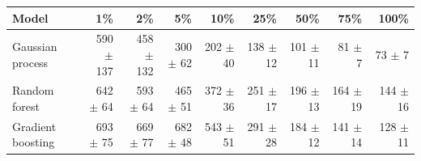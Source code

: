 \begin{tabular}{lrrrrrrrr}
\toprule
\textbf{Model} & \textbf{1\%} & \textbf{2\%} & \textbf{5\%} & \textbf{10\%} & \textbf{25\%} & \textbf{50\%} & \textbf{75\%} & \textbf{100\%} \\
\midrule
Gaussian process & 590 $\pm$ 137 & 458 $\pm$ 132 & 300 $\pm$ 62 & 202 $\pm$ 40 & 138 $\pm$ 12 & 101 $\pm$ 11 & 81 $\pm$ 7 & 73 $\pm$ 7 \\
Random forest & 642 $\pm$ 64 & 593 $\pm$ 64 & 465 $\pm$ 51 & 372 $\pm$ 36 & 251 $\pm$ 17 & 196 $\pm$ 13 & 164 $\pm$ 19 & 144 $\pm$ 16 \\
Gradient boosting & 693 $\pm$ 75 & 669 $\pm$ 77 & 682 $\pm$ 48 & 543 $\pm$ 51 & 291 $\pm$ 28 & 184 $\pm$ 12 & 141 $\pm$ 14 & 128 $\pm$ 11 \\
\bottomrule
\end{tabular}
